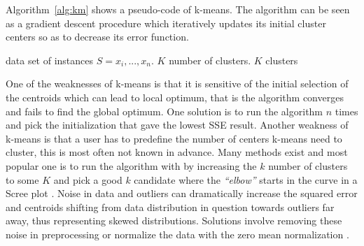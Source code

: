 Algorithm~\ref{alg:km} shows a pseudo-code of k-means. The algorithm can be seen as a gradient descent procedure which iteratively updates its initial cluster centers so as to decrease its error function.
\begin{center}
\newcommand{\km}{\ensuremath{\mbox{\sc K-means}}}
\begin{algorithm}[h!]
\caption{$\km(S,K)$}\label{alg:km}
\begin{algorithmic}[1]
\REQUIRE data set of instances $S = {x_i,...,x_n}$. $K$ number of clusters.  
\ENSURE $K$ clusters
\medskip
{}

\ENDWHILE
\end{algorithmic}
\end{algorithm}
\end{center}
One of the weaknesses of k-means is that it is sensitive of the initial selection of the centroids which can lead to local optimum, that is the algorithm converges and fails to find the global optimum. One solution is to run the algorithm $n$ times and pick the initialization that gave the lowest SSE result. Another weakness of k-means is that a user has to predefine the number of centers k-means need to cluster, this is most often not known in advance. Many methods exist and most popular one is to run the algorithm with by increasing the $k$ number of clusters to some $K$ and pick a good $k$ candidate where the \textit{``elbow''} starts in the curve in a Scree plot \citep{Han:2006DM}. Noise in data and outliers can dramatically increase the squared error and centroids shifting from data distribution in question towards outliers far away, thus representing skewed distributions. Solutions involve removing these noise in preprocessing or normalize the data with the zero mean normalization \citep{Xu:2005Clustering, Han:2006DM}.



